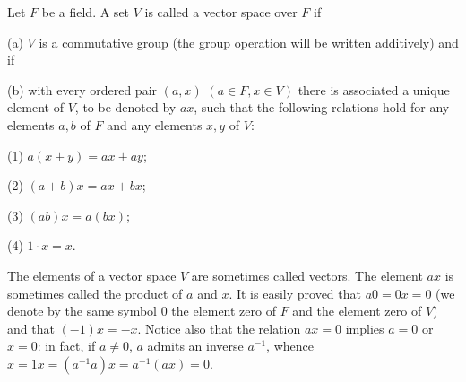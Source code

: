 Let $F$ be a field. A set $V$ is called a vector space over $F$ if

(a) $V$ is a commutative group (the group operation will be written additively) and if

(b) with every ordered pair $(a, x)$ $(a \in F, x \in V)$ there is associated a unique element of $V$, to be denoted by $ax$, such that the following relations hold for any elements $a, b$ of $F$ and any elements $x, y$ of $V$:

(1) $a(x + y) = ax + ay$;

(2) $(a + b)x = ax + bx$;

(3) $(ab)x = a(bx)$;

(4) $1 \cdot x = x$.

The elements of a vector space $V$ are sometimes called vectors. The element $ax$ is sometimes called the product of $a$ and $x$. It is easily proved that $a0 = 0x = 0$ (we denote by the same symbol $0$ the element zero of $F$ and the element zero of $V$) and that $(-1)x = -x$. Notice also that the relation $ax = 0$ implies $a = 0$ or $x = 0$: in fact, if $a \neq 0$, $a$ admits an inverse $a^{-1}$, whence $x = 1x = (a^{-1}a)x = a^{-1}(ax) = 0$.
